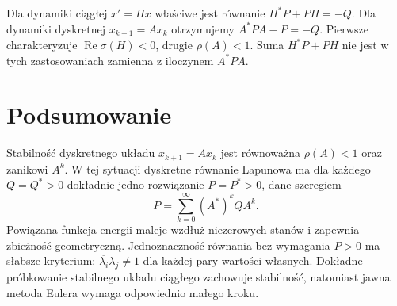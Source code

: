 \begin{uwaga}
\label{rem:lin23-compare}
Dla dynamiki ciągłej
\(x'=Hx\) właściwe jest
równanie \(H^*P+PH=-Q\).
Dla dynamiki dyskretnej
\(x_{k+1}=Ax_k\)
otrzymujemy \(A^*PA-P=-Q\).
Pierwsze charakteryzuje
\(\operatorname{Re}\sigma(H)<0\),
drugie \(\rho(A)<1\).
Suma \(H^*P+PH\) nie jest
w tych zastosowaniach
zamienna z iloczynem \(A^*PA\).
\end{uwaga}

\section{Podsumowanie}
\label{sec:lin23-summary}

Stabilność dyskretnego układu
\(x_{k+1}=Ax_k\) jest równoważna
\(\rho(A)<1\) oraz zanikowi \(A^k\).
W tej sytuacji dyskretne
równanie Lapunowa ma
dla każdego \(Q=Q^*>0\)
dokładnie jedno rozwiązanie
\(P=P^*>0\), dane szeregiem
\[
 P=\sum_{k=0}^\infty(A^*)^kQA^k.
\]
Powiązana funkcja energii
maleje wzdłuż niezerowych stanów
i zapewnia zbieżność geometryczną.
Jednoznaczność równania
bez wymagania \(P>0\)
ma słabsze kryterium:
\(\overline{\lambda_i}\lambda_j\ne1\)
dla każdej pary wartości własnych.
Dokładne próbkowanie
stabilnego układu ciągłego
zachowuje stabilność,
natomiast jawna metoda Eulera
wymaga odpowiednio małego kroku.

